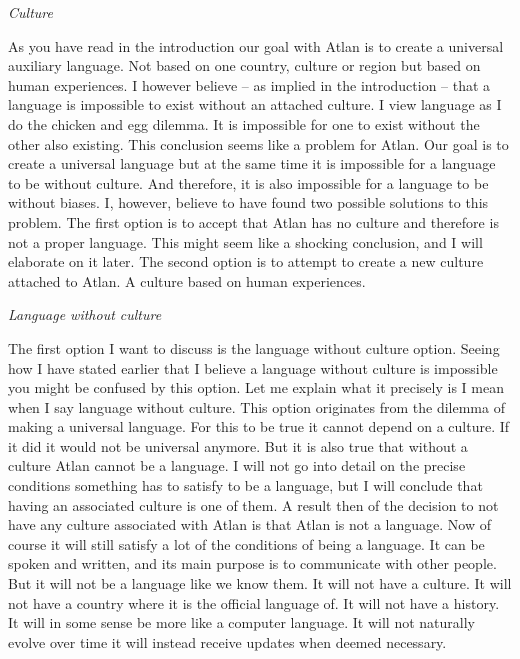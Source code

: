 \noindent \textit{Culture } 

\noindent As you have read in the introduction our goal with Atlan is to create a universal auxiliary language. Not based on one country, culture or region but based on human experiences. I however believe – as implied in the introduction – that a language is impossible to exist without an attached culture. I view language as I do the chicken and egg dilemma. It is impossible for one to exist without the other also existing. This conclusion seems like a problem for Atlan. Our goal is to create a universal language but at the same time it is impossible for a language to be without culture. And therefore, it is also impossible for a language to be without biases. I, however, believe to have found two possible solutions to this problem. The first option is to accept that Atlan has no culture and therefore is not a proper language. This might seem like a shocking conclusion, and I will elaborate on it later. The second option is to attempt to create a new culture attached to Atlan. A culture based on human experiences.  

\noindent \textit{Language without culture} 

\noindent The first option I want to discuss is the language without culture option. Seeing how I have stated earlier that I believe a language without culture is impossible you might be confused by this option. Let me explain what it precisely is I mean when I say language without culture. This option originates from the dilemma of making a universal language. For this to be true it cannot depend on a culture. If it did it would not be universal anymore. But it is also true that without a culture Atlan cannot be a language. I will not go into detail on the precise conditions something has to satisfy to be a language, but I will conclude that having an associated culture is one of them. A result then of the decision to not have any culture associated with Atlan is that Atlan is not a language. Now of course it will still satisfy a lot of the conditions of being a language. It can be spoken and written, and its main purpose is to communicate with other people. But it will not be a language like we know them. It will not have a culture. It will not have a country where it is the official language of. It will not have a history. It will in some sense be more like a computer language. It will not naturally evolve over time it will instead receive updates when deemed necessary.  

